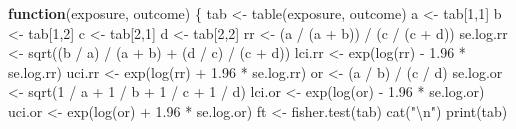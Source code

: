 \documentclass[
  12pt,
  a4paper]{book}
\newenvironment{Shaded}{\begin{snugshade}}{\end{snugshade}}
\newcommand{\ControlFlowTok}[1]{\textcolor[rgb]{0.13,0.29,0.53}{\textbf{#1}}}
\newcommand{\DecValTok}[1]{\textcolor[rgb]{0.00,0.00,0.81}{#1}}
\newcommand{\FloatTok}[1]{\textcolor[rgb]{0.00,0.00,0.81}{#1}}
\newcommand{\FunctionTok}[1]{\textcolor[rgb]{0.00,0.00,0.00}{#1}}
\newcommand{\NormalTok}[1]{#1}
\newcommand{\OtherTok}[1]{\textcolor[rgb]{0.56,0.35,0.01}{#1}}
\newcommand{\SpecialCharTok}[1]{\textcolor[rgb]{0.00,0.00,0.00}{#1}}
\newcommand{\StringTok}[1]{\textcolor[rgb]{0.31,0.60,0.02}{#1}}
\begin{document}
\begin{Shaded}
\begin{Highlighting}[]
\ControlFlowTok{function}\NormalTok{(exposure, outcome) \{}
\NormalTok{  tab }\OtherTok{\textless{}{-}} \FunctionTok{table}\NormalTok{(exposure, outcome)}
\NormalTok{  a }\OtherTok{\textless{}{-}}\NormalTok{ tab[}\DecValTok{1}\NormalTok{,}\DecValTok{1}\NormalTok{]}
\NormalTok{  b }\OtherTok{\textless{}{-}}\NormalTok{ tab[}\DecValTok{1}\NormalTok{,}\DecValTok{2}\NormalTok{]}
\NormalTok{  c }\OtherTok{\textless{}{-}}\NormalTok{ tab[}\DecValTok{2}\NormalTok{,}\DecValTok{1}\NormalTok{]}
\NormalTok{  d }\OtherTok{\textless{}{-}}\NormalTok{ tab[}\DecValTok{2}\NormalTok{,}\DecValTok{2}\NormalTok{]}
\NormalTok{  rr }\OtherTok{\textless{}{-}}\NormalTok{ (a }\SpecialCharTok{/}\NormalTok{ (a }\SpecialCharTok{+}\NormalTok{ b)) }\SpecialCharTok{/}\NormalTok{ (c }\SpecialCharTok{/}\NormalTok{ (c }\SpecialCharTok{+}\NormalTok{ d))}
\NormalTok{  se.log.rr }\OtherTok{\textless{}{-}} \FunctionTok{sqrt}\NormalTok{((b }\SpecialCharTok{/}\NormalTok{ a) }\SpecialCharTok{/}\NormalTok{ (a }\SpecialCharTok{+}\NormalTok{ b) }\SpecialCharTok{+}\NormalTok{ (d }\SpecialCharTok{/}\NormalTok{ c) }\SpecialCharTok{/}\NormalTok{ (c }\SpecialCharTok{+}\NormalTok{ d)) }
\NormalTok{  lci.rr }\OtherTok{\textless{}{-}} \FunctionTok{exp}\NormalTok{(}\FunctionTok{log}\NormalTok{(rr) }\SpecialCharTok{{-}} \FloatTok{1.96} \SpecialCharTok{*}\NormalTok{ se.log.rr)}
\NormalTok{  uci.rr }\OtherTok{\textless{}{-}} \FunctionTok{exp}\NormalTok{(}\FunctionTok{log}\NormalTok{(rr) }\SpecialCharTok{+} \FloatTok{1.96} \SpecialCharTok{*}\NormalTok{ se.log.rr)}
\NormalTok{  or }\OtherTok{\textless{}{-}}\NormalTok{ (a }\SpecialCharTok{/}\NormalTok{ b) }\SpecialCharTok{/}\NormalTok{ (c }\SpecialCharTok{/}\NormalTok{ d)}
\NormalTok{  se.log.or }\OtherTok{\textless{}{-}} \FunctionTok{sqrt}\NormalTok{(}\DecValTok{1} \SpecialCharTok{/}\NormalTok{ a }\SpecialCharTok{+} \DecValTok{1} \SpecialCharTok{/}\NormalTok{ b }\SpecialCharTok{+} \DecValTok{1} \SpecialCharTok{/}\NormalTok{ c }\SpecialCharTok{+} \DecValTok{1} \SpecialCharTok{/}\NormalTok{ d)}
\NormalTok{  lci.or }\OtherTok{\textless{}{-}} \FunctionTok{exp}\NormalTok{(}\FunctionTok{log}\NormalTok{(or) }\SpecialCharTok{{-}} \FloatTok{1.96} \SpecialCharTok{*}\NormalTok{ se.log.or)}
\NormalTok{  uci.or }\OtherTok{\textless{}{-}} \FunctionTok{exp}\NormalTok{(}\FunctionTok{log}\NormalTok{(or) }\SpecialCharTok{+} \FloatTok{1.96} \SpecialCharTok{*}\NormalTok{ se.log.or)}
\NormalTok{  ft }\OtherTok{\textless{}{-}} \FunctionTok{fisher.test}\NormalTok{(tab)}
  \FunctionTok{cat}\NormalTok{(}\StringTok{"}\SpecialCharTok{\textbackslash{}n}\StringTok{"}\NormalTok{)}
  \FunctionTok{print}\NormalTok{(tab)}
  

\end{Highlighting}
\end{Shaded}
\end{document}
